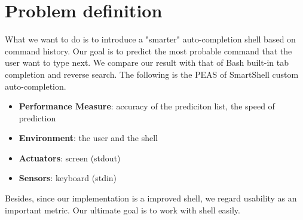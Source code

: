 \documentclass[11pt,a4paper]{article}
\begin{document}
\section*{Problem definition}
What we want to do is to introduce a "smarter" auto-completion shell based on command history.
Our goal is to predict the most probable command that the user want to type next. 
We compare our result with that of Bash built-in tab completion and reverse search. 
The following is the PEAS of SmartShell custom auto-completion.

\begin{itemize}
\item {\bf Performance Measure}: accuracy of the prediciton list, the speed of prediction
\item {\bf Environment}: the user and the shell
\item {\bf Actuators}: screen (stdout)
\item {\bf Sensors}: keyboard (stdin)
\end{itemize}

Besides, since our implementation is a improved shell, we regard usability as an important metric.
Our ultimate goal is to work with shell easily.
\end{document}
